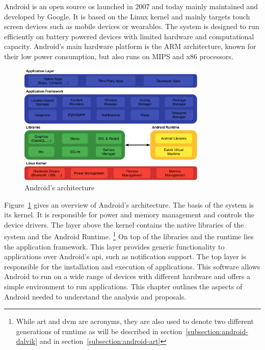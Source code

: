 Android is an open source \gls{os} launched in 2007 and today mainly maintained and developed by Google.
It is based on the Linux kernel and mainly targets touch screen devices such as mobile devices or wearables.
The system is designed to run efficiently on battery powered devices with limited hardware and computational capacity.
Android's main hardware platform is the ARM architecture, known for their low power consumption, but also runs on MIPS and x86 processors.
\newline
\newline
\begin{figure}[h]
    \centering
    \includegraphics[width=0.8\textwidth]{data/stack.png}
    \caption{Android's architecture \cite{googleDalvik}}
    \label{fig:androidArchitecture}
\end{figure}
Figure~\ref{fig:androidArchitecture} gives an overview of Android's architecture.
\newline
The basis of the system is its kernel.
It is responsible for power and memory management and controls the device drivers.
\newline
The layer above the kernel contains the native libraries of the system and the Android Runtime.
\footnote[1]{While \gls{art} and \gls{dvm} are acronyms, they are also used to denote two different generations of runtime as will be described in section~\ref{subsection:android-dalvik} and in section~\ref{subsection:android-art}}
\newline
On top of the libraries and the runtime lies the application framework.
This layer provides generic functionality to applications over Android's \gls{api}, such as notification support.
\newline
The top layer is responsible for the installation and execution of applications.
\newline
This software allows Android to run on a wide range of devices with different hardware and offers a simple environment to run applications.
\newline
\newline
This chapter outlines the aspects of Android needed to understand the analysis and proposals.
